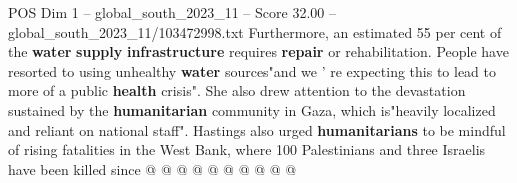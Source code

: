 \begin{textsample}{POS Dim 1 – global\_south\_2023\_11 – Score 32.00 – global\_south\_2023\_11/103472998.txt}
Furthermore, an estimated 55 per cent of the \textbf{water} \textbf{supply} \textbf{infrastructure} requires \textbf{repair} or rehabilitation.
People have resorted to using unhealthy \textbf{water} sources"and we ' re expecting this to lead to more of a public \textbf{health} crisis".
She also drew attention to the devastation sustained by the \textbf{humanitarian} community in Gaza, which is"heavily localized and reliant on national staff".
Hastings also urged \textbf{humanitarians} to be mindful of rising fatalities in the West Bank, where 100 Palestinians and three Israelis have been killed since @ @ @ @ @ @ @ @ @ @

\end{textsample}
